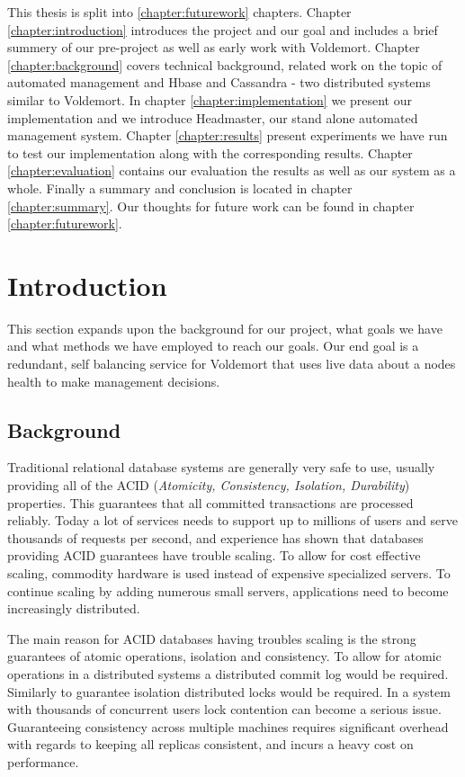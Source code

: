 
This thesis is split into \ref{chapter:futurework} chapters. Chapter \ref{chapter:introduction} introduces the project and our goal and includes a brief summery of our pre-project as well as early work with Voldemort. Chapter \ref{chapter:background} covers technical background, related work on the topic of automated management and Hbase and Cassandra - two distributed systems similar to Voldemort. In chapter \ref{chapter:implementation} we present our implementation and we introduce Headmaster, our stand alone automated management system. Chapter \ref{chapter:results} present experiments we have run to test our implementation along with the corresponding results. Chapter \ref{chapter:evaluation} contains our evaluation the results as well as our system as a whole. Finally a summary and conclusion is located in chapter \ref{chapter:summary}. Our thoughts for future work can be found in chapter \ref{chapter:futurework}. 

\section{Introduction}
This section expands upon the background for our project, what goals we have and what methods we have employed to reach our goals. 
Our end goal is a redundant, self balancing service for Voldemort that uses live data about a nodes health to make management decisions.

\subsection{Background}
Traditional relational database systems are generally very safe to use, usually providing all of the ACID (\emph{Atomicity, Consistency, Isolation, Durability}) properties.
This guarantees that all committed transactions are processed reliably. 
Today a lot of services needs to support up to millions of users and serve thousands of requests per second, and experience has shown that databases providing ACID guarantees have trouble scaling. 
To allow for cost effective scaling, commodity hardware is used instead of expensive specialized servers. To continue scaling by adding numerous small servers, applications need to become increasingly distributed.

The main reason for ACID databases having troubles scaling is the strong guarantees of atomic operations, isolation and consistency. 
To allow for atomic operations in a distributed systems a distributed commit log would be required. 
Similarly to guarantee isolation distributed locks would be required. In a system with thousands of concurrent users lock contention can become a serious issue. 
Guaranteeing consistency across multiple machines requires significant overhead with regards to keeping all replicas consistent, and incurs a heavy cost on performance. 

